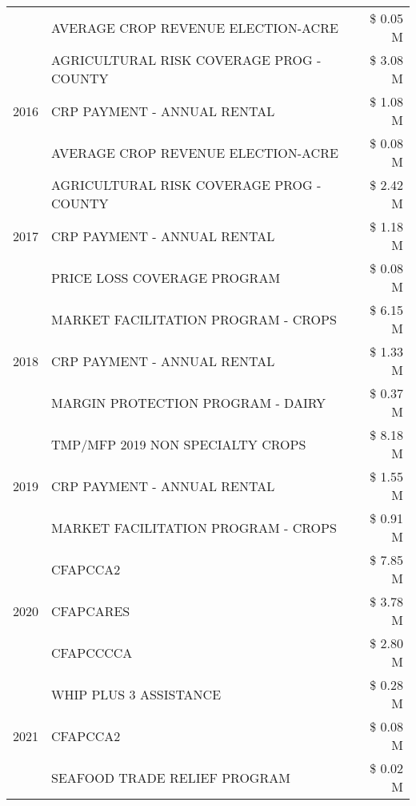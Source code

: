 \begin{tabular}{llr}
 & AVERAGE CROP REVENUE ELECTION-ACRE & \$ 0.05 M \\
\cline{1-3}
\multirow[t]{3}{*}{2016} & AGRICULTURAL RISK COVERAGE PROG - COUNTY & \$ 3.08 M \\
 & CRP PAYMENT - ANNUAL RENTAL & \$ 1.08 M \\
 & AVERAGE CROP REVENUE ELECTION-ACRE & \$ 0.08 M \\
\cline{1-3}
\multirow[t]{3}{*}{2017} & AGRICULTURAL RISK COVERAGE PROG - COUNTY & \$ 2.42 M \\
 & CRP PAYMENT - ANNUAL RENTAL & \$ 1.18 M \\
 & PRICE LOSS COVERAGE PROGRAM & \$ 0.08 M \\
\cline{1-3}
\multirow[t]{3}{*}{2018} & MARKET FACILITATION PROGRAM - CROPS & \$ 6.15 M \\
 & CRP PAYMENT - ANNUAL RENTAL & \$ 1.33 M \\
 & MARGIN PROTECTION PROGRAM - DAIRY & \$ 0.37 M \\
\cline{1-3}
\multirow[t]{3}{*}{2019} & TMP/MFP 2019 NON SPECIALTY CROPS & \$ 8.18 M \\
 & CRP PAYMENT - ANNUAL RENTAL & \$ 1.55 M \\
 & MARKET FACILITATION PROGRAM - CROPS & \$ 0.91 M \\
\cline{1-3}
\multirow[t]{3}{*}{2020} & CFAPCCA2 & \$ 7.85 M \\
 & CFAPCARES & \$ 3.78 M \\
 & CFAPCCCCA & \$ 2.80 M \\
\cline{1-3}
\multirow[t]{3}{*}{2021} & WHIP PLUS 3 ASSISTANCE & \$ 0.28 M \\
 & CFAPCCA2 & \$ 0.08 M \\
 & SEAFOOD TRADE RELIEF PROGRAM & \$ 0.02 M \\
\cline{1-3}
\bottomrule
\end{tabular}
